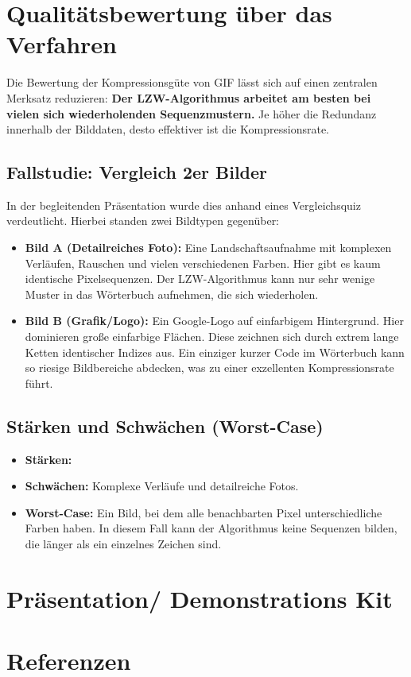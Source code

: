 \documentclass[11pt,a4paper]{article}
\begin{document}
\section{Qualitätsbewertung über das Verfahren}
Die Bewertung der Kompressionsgüte von GIF lässt sich auf einen zentralen Merksatz reduzieren: \textbf{Der LZW-Algorithmus arbeitet am besten bei vielen sich wiederholenden Sequenzmustern.} Je höher die Redundanz innerhalb der Bilddaten, desto effektiver ist die Kompressionsrate.

\subsection{Fallstudie: Vergleich 2er Bilder}
In der begleitenden Präsentation wurde dies anhand eines Vergleichsquiz verdeutlicht. Hierbei standen zwei Bildtypen gegenüber:
\begin{itemize}
	\item \textbf{Bild A (Detailreiches Foto):} Eine Landschaftsaufnahme mit komplexen Verläufen, Rauschen und vielen verschiedenen Farben. Hier gibt es kaum identische Pixelsequenzen. Der LZW-Algorithmus kann nur sehr wenige Muster in das Wörterbuch aufnehmen, die sich wiederholen.
	\item \textbf{Bild B (Grafik/Logo):} Ein Google-Logo auf einfarbigem Hintergrund. Hier dominieren große einfarbige Flächen. Diese zeichnen sich durch extrem lange Ketten identischer Indizes aus. Ein einziger kurzer Code im Wörterbuch kann so riesige Bildbereiche abdecken, was zu einer exzellenten Kompressionsrate führt.
\end{itemize}

\subsection{Stärken und Schwächen (Worst-Case)}
\begin{itemize}
	\item \textbf{Stärken:}
	\item \textbf{Schwächen:} Komplexe Verläufe und detailreiche Fotos. 
	\item \textbf{Worst-Case:} Ein Bild, bei dem alle benachbarten Pixel unterschiedliche Farben haben. In diesem Fall kann der Algorithmus keine Sequenzen bilden, die länger als ein einzelnes Zeichen sind.
\end{itemize}

\section{Präsentation/ Demonstrations Kit} 
	
	\section{Referenzen}
	
\end{document}
